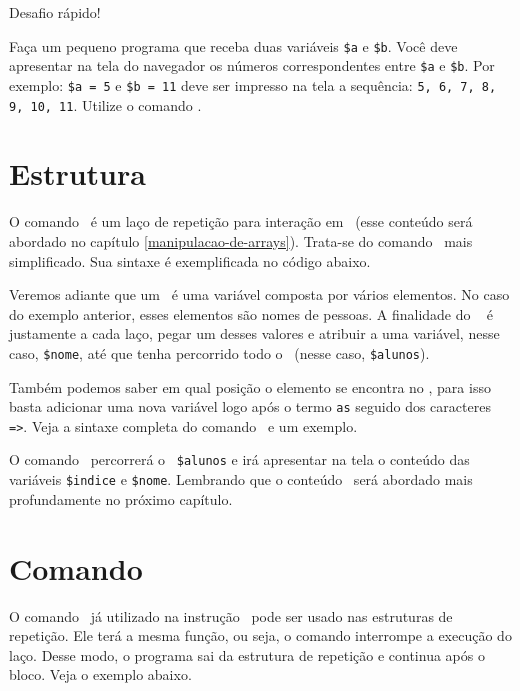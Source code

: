 {\Large Desafio rápido!}

Faça um pequeno programa que receba duas variáveis \texttt{\$a} e \texttt{\$b}. Você deve
apresentar na tela do navegador os números correspondentes entre \texttt{\$a} e 
\texttt{\$b}. Por exemplo: \texttt{\$a = 5} e \texttt{\$b = 11} deve ser impresso na tela
a sequência: \texttt{5, 6, 7, 8, 9, 10, 11}. Utilize o comando \comandofor.

\section{Estrutura \comandoforeach}
\label{estrutura-foreach}

O comando \comandoforeach~é um laço de repetição para interação em 
\tipoarray~(esse conteúdo será abordado no capítulo \ref{manipulacao-de-arrays}).
Trata-se do comando \comandofor~mais simplificado. Sua sintaxe é exemplificada no código abaixo.



Veremos adiante que um \tipoarray~é uma variável composta por vários elementos. No caso do 
exemplo anterior, esses elementos são nomes de pessoas. A finalidade do \comandoforeach~
é justamente a cada laço, pegar um desses valores e atribuir a uma variável, nesse caso, 
\texttt{\$nome}, até que tenha percorrido todo o \tipoarray~(nesse caso, \texttt{\$alunos}).

Também podemos saber em qual posição o elemento se encontra no \tipoarray, para isso basta 
adicionar uma nova variável logo após o termo \texttt{as} seguido dos caracteres \texttt{=>}.
Veja a sintaxe completa do comando \comandoforeach~e um exemplo.



O comando \comandoforeach~percorrerá o \tipoarray~\texttt{\$alunos} e irá apresentar
na tela o conteúdo das variáveis \texttt{\$indice} e \texttt{\$nome}. Lembrando que o
conteúdo \tipoarray~será abordado mais profundamente no próximo capítulo.

\section{Comando \comandobreak}
\label{comando-break}

O comando \comandobreak~já utilizado na instrução \comandoswitch~pode ser usado nas 
estruturas de repetição. Ele terá a mesma função, ou seja, o comando interrompe a 
execução do laço. Desse modo, o programa sai da estrutura de repetição e continua 
após o bloco. Veja o exemplo abaixo.

